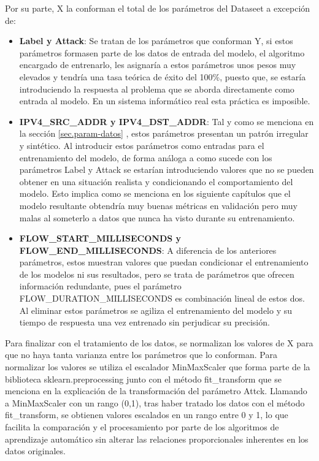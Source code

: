 Por su parte, X la conforman el total de los parámetros del Dataseet a excepción de:
\begin{itemize}
	\item \textbf{Label y Attack}: Se tratan de los parámetros que conforman Y, si estos parámetros formasen parte de los datos de entrada del modelo, el algoritmo encargado de entrenarlo, les asignaría a estos parámetros unos pesos muy elevados y tendría una tasa teórica de éxito del 100\%, puesto que, se estaría introduciendo la respuesta al problema que se aborda directamente como entrada al modelo. En un sistema informático real esta práctica es imposible.
	\item \textbf{IPV4\_SRC\_ADDR y IPV4\_DST\_ADDR}: Tal y como se menciona en la sección \ref{sec.param-datos} , estos parámetros presentan un patrón irregular y sintético. Al introducir estos parámetros como entradas para el entrenamiento del modelo, de forma análoga a como sucede con los parámetros Label y Attack se estarían introduciendo valores que no se pueden obtener en una situación realista y condicionando el comportamiento del modelo. Esto implica como se menciona en los siguiente capítulos que el modelo resultante obtendría muy buenas métricas en validación pero muy malas al someterlo a datos que nunca ha visto durante su entrenamiento.
	\item \textbf{FLOW\_START\_MILLISECONDS y FLOW\_END\_MILLISECONDS}: A diferencia de los anteriores parámetros, estos muestran valores que puedan condicionar el entrenamiento de los modelos ni sus resultados, pero se trata de parámetros que ofrecen información redundante, pues el parámetro FLOW\_DURATION\_MILLISECONDS es combinación lineal de estos dos. Al eliminar estos parámetros se agiliza el entrenamiento del modelo y su tiempo de respuesta una vez entrenado sin perjudicar su precisión.
\end{itemize}

Para finalizar con el tratamiento de los datos, se normalizan los valores de X para que no haya tanta varianza entre los parámetros que lo conforman. Para normalizar los valores se utiliza el escalador MinMaxScaler que forma parte de la biblioteca sklearn.preprocessing junto con el método fit\_transform que se menciona en la explicación de la transformación del parámetro Attck. Llamando a MinMaxScaler con un rango (0,1), tras haber tratado los datos con el método fit\_transform, se obtienen valores escalados en un rango entre 0 y 1, lo que facilita la comparación y el procesamiento por parte de los algoritmos de aprendizaje automático sin alterar las relaciones proporcionales inherentes en los datos originales.
